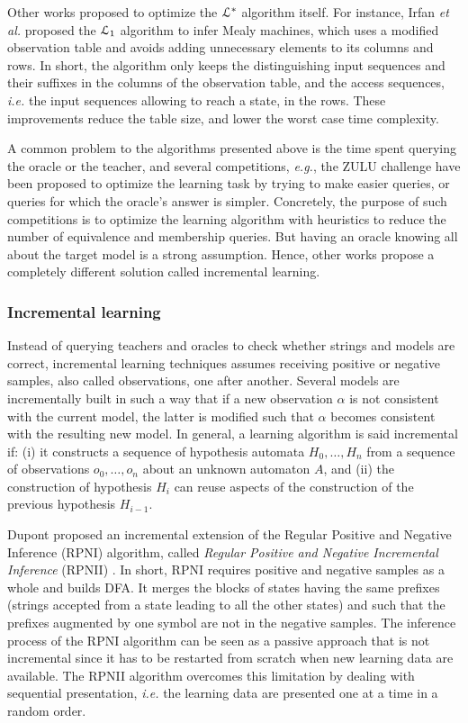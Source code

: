 Other works proposed to optimize the $\EuScript{L}^*$ algorithm
itself. For instance, Irfan \emph{et al.} proposed the $\EuScript{L}_1$
algorithm \cite{irfan12} to infer Mealy machines, which uses a
modified observation table and avoids adding unnecessary elements
to its columns and rows. In short, the algorithm only keeps the
distinguishing input sequences and their suffixes in the columns
of the observation table, and the access sequences, \emph{i.e.} the
input sequences allowing to reach a state, in the rows. These
improvements reduce the table size, and lower the worst case time
complexity.

A common problem to the algorithms presented above is the time
spent querying the oracle or the teacher, and several
competitions, \emph{e.g.}, the ZULU challenge \cite{zulu} have been
proposed to optimize the learning task by trying to make easier
queries, or queries for which the oracle's answer is simpler.
Concretely, the purpose of such competitions is to optimize the
learning algorithm with heuristics to reduce the number of
equivalence and membership queries. But having an oracle knowing
all about the target model is a strong assumption. Hence, other
works propose a completely different solution called incremental
learning.

\subsubsection{Incremental learning}
\label{sec:active-increment}

Instead of querying teachers and oracles to check whether strings
and models are correct, incremental learning techniques assumes
receiving positive or negative samples, also called observations,
one after another.  Several models are incrementally built in
such a way that if a new observation $\alpha$ is not consistent
with the current model, the latter is modified such that $\alpha$
becomes consistent with the resulting new model.  In general, a
learning algorithm is said incremental if: (i) it constructs a
sequence of hypothesis automata $H_0, \dots, H_n$ from a sequence
of observations $o_0, \dots, o_n$  about an unknown automaton
$A$, and (ii) the construction of hypothesis $H_i$ can reuse
aspects of the construction of the previous hypothesis $H_{i-1}$.

Dupont proposed an incremental extension of the Regular Positive
and Negative Inference (RPNI) algorithm, called \textit{Regular
Positive and Negative Incremental Inference} (RPNII)
\cite{Dupont96incrementalregular}. In short, RPNI requires
positive and negative samples as a whole and builds DFA. It
merges the blocks of states having the same prefixes (strings
accepted from a state leading to all the other states) and such
that the prefixes augmented by one symbol are not in the negative
samples. The inference process of the RPNI algorithm can be seen
as a passive approach that is not incremental since it has to
be restarted from scratch when new learning data are available.
The RPNII algorithm overcomes this limitation by dealing with
sequential presentation, \emph{i.e.} the learning data are presented one
at a time in a random order.

